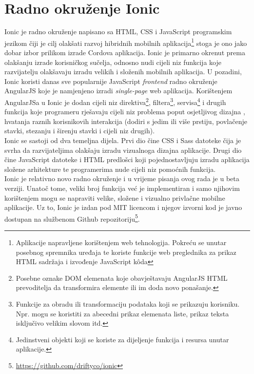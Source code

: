 \section{Radno okruženje Ionic}

Ionic je radno okruženje napisano sa HTML, CSS i JavaScript programskim jezikom čiji je cilj olakšati razvoj hibridnih mobilnih aplikacija\footnote{Aplikacije napravljene korištenjem web tehnologija. 
Pokreću se unutar posebnog spremnika uređaja te koriste funkcije web preglednika za prikaz HTML sadržaja i izvođenje JavaScript k\^oda} stoga je ono jako dobar izbor prilikom izrade Cordova aplikacija. 
Ionic je primarno okrenut prema olakšanju izrade korisničkog sučelja, odnosno nudi cijeli niz funkcija koje razvijatelju olakšavaju izradu velikih i složenih mobilnih aplikacija. 
U pozadini, Ionic koristi danas sve popularnije JavaScript \textit{frontend} radno okruženje AngularJS koje je namjenjeno izradi \textit{single-page} web aplikacija. 
Korištenjem AngularJSa u Ionic je dodan cijeli niz direktiva\footnote{Posebne oznake DOM elemenata koje obavještavaju AngularJS HTML prevoditelja da transformira elemente ili im doda novo ponašanje.}, filtera\footnote{Funkcije za obradu ili transformaciju podataka koji se prikazuju korisniku. 
Npr. mogu se koristiti za abecedni prikaz elemenata liste, prikaz teksta isključivo velikim slovom itd.}, servisa\footnote{Jedinstveni objekti  koji se koriste za dijeljenje funkcija i resursa unutar aplikacije.} i drugih funkcija koje programeru rješavaju cijeli niz problema poput osjetljivog dizajna , hvatanja raznih korisnikovih interakcija (dodiri s jedim ili više prstiju, povlačenje  stavki, stezanju i širenju stavki  i cijeli niz drugih). 
\\

Ionic se sastoji od dva temeljna dijela. 
Prvi dio čine CSS i Sass datoteke čija je svrha da razvijateljima olakšaju izradu vizualnoga dizajna aplikacije. 
Drugi dio čine JavaScript datoteke i HTML predlošci koji pojednostavljuju izradu aplikacija složene arhitekture te programerima nude cijeli niz pomoćnih funkcija.
\\

Ionic je relativno novo radno okruženje i u vrijeme pisanja ovog rada je u beta verziji. 
Unatoč tome, veliki broj funkcija već je implementiran i samo njihovim korištenjem mogu se napraviti velike, složene i vizualno privlačne mobilne aplikacije. 
Uz to, Ionic je izdan pod MIT licencom i njegov izvorni kod je javno dostupan na službenom Github repozitoriju\footnote{\url{https://github.com/driftyco/ionic}}.